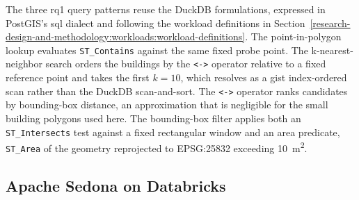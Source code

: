 The three \acrshort{rq}1 query patterns reuse the DuckDB formulations, expressed in PostGIS's \acrshort{sql} dialect and following the workload definitions in Section~\ref{research-design-and-methodology:workloads:workload-definitions}. The point-in-polygon lookup evaluates \texttt{ST\_Contains} against the same fixed probe point. The k-nearest-neighbor search orders the buildings by the \texttt{<->} operator relative to a fixed reference point and takes the first $k = \num{10}$, which resolves as a \acrshort{gist} index-ordered scan rather than the DuckDB scan-and-sort. The \texttt{<->} operator ranks candidates by bounding-box distance, an approximation that is negligible for the small building polygons used here. The bounding-box filter applies both an \texttt{ST\_Intersects} test against a fixed rectangular window and an area predicate, \texttt{ST\_Area} of the geometry reprojected to EPSG:25832 exceeding \SI{10}{\meter\squared}.

\subsection{Apache Sedona on Databricks}
\label{system-architecture-and-implementation:compute-configuration:apache-sedona-on-databricks}

